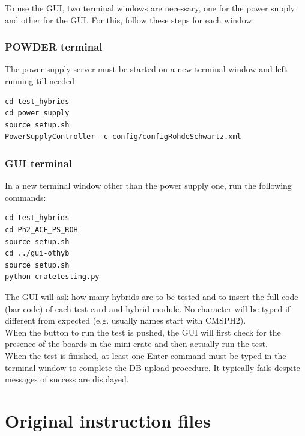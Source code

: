 \documentclass[10pt,a4paper]{article}
\begin{document}
To use the GUI, two terminal windows are necessary, one for the power supply and other for the GUI. For this, follow these steps for each window:

\subsubsection{POWDER terminal}

The power supply server must be started on a new terminal window and left running till needed

\begin{framed}
\begin{verbatim}
cd test_hybrids
cd power_supply
source setup.sh
PowerSupplyController -c config/configRohdeSchwartz.xml
\end{verbatim}
\end{framed}

\subsubsection{GUI terminal}

In a new terminal window other than the power supply one, run the following commands:

\begin{framed}
\begin{verbatim}
cd test_hybrids
cd Ph2_ACF_PS_ROH
source setup.sh 
cd ../gui-othyb
source setup.sh 
python cratetesting.py
\end{verbatim}
\end{framed}

The GUI will ask how many hybrids are to be tested and to insert the full code (bar code) of each test card and hybrid module.
No character will be typed if different from expected (e.g. usually names start with CMSPH2). \\
When the button to run the test is pushed, the GUI will first check for the presence of the boards in the mini-crate and then actually run the test. \\

When the test is finished, at least one Enter command must be typed in the terminal window to complete the DB upload procedure. It typically fails despite messages of success are displayed.

\newpage

\appendix

\appendixpage
\section{Original instruction files}


\end{document}
